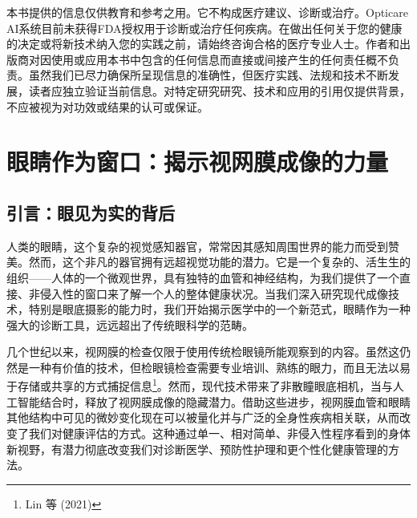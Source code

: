 \documentclass[
  Letterpaper,
]{scrbook}
\begin{document}
\begin{tcolorbox}[enhanced jigsaw, arc=.35mm, breakable, colbacktitle=quarto-callout-caution-color!10!white, colback=white, toprule=.15mm, opacityback=0, left=2mm, titlerule=0mm, colframe=quarto-callout-caution-color-frame, bottomrule=.15mm, toptitle=1mm, bottomtitle=1mm, rightrule=.15mm, leftrule=.75mm, coltitle=black, title=\textcolor{quarto-callout-caution-color}{\faFire}\hspace{0.5em}{免责声明}, opacitybacktitle=0.6]

本书提供的信息仅供教育和参考之用。它不构成医疗建议、诊断或治疗。Opticare
AI系统目前未获得FDA授权用于诊断或治疗任何疾病。在做出任何关于您的健康的决定或将新技术纳入您的实践之前，请始终咨询合格的医疗专业人士。作者和出版商对因使用或应用本书中包含的任何信息而直接或间接产生的任何责任概不负责。虽然我们已尽力确保所呈现信息的准确性，但医疗实践、法规和技术不断发展，读者应独立验证当前信息。对特定研究研究、技术和应用的引用仅提供背景，不应被视为对功效或结果的认可或保证。

\end{tcolorbox}


\chapter{眼睛作为窗口：揭示视网膜成像的力量}\label{ux773cux775bux4f5cux4e3aux7a97ux53e3ux63edux793aux89c6ux7f51ux819cux6210ux50cfux7684ux529bux91cf}

\section{引言：眼见为实的背后}\label{ux5f15ux8a00ux773cux89c1ux4e3aux5b9eux7684ux80ccux540e}

人类的眼睛，这个复杂的视觉感知器官，常常因其感知周围世界的能力而受到赞美。然而，这个非凡的器官拥有远超视觉功能的潜力。它是一个复杂的、活生生的组织------人体的一个微观世界，具有独特的血管和神经结构，为我们提供了一个直接、非侵入性的窗口来了解一个人的整体健康状况。当我们深入研究现代成像技术，特别是眼底摄影的能力时，我们开始揭示医学中的一个新范式，眼睛作为一种强大的诊断工具，远远超出了传统眼科学的范畴。

几个世纪以来，视网膜的检查仅限于使用传统检眼镜所能观察到的内容。虽然这仍然是一种有价值的技术，但检眼镜检查需要专业培训、熟练的眼力，而且无法以易于存储或共享的方式捕捉信息\footnote{Lin
  等 (2021)}。然而，现代技术带来了非散瞳眼底相机，当与人工智能结合时，释放了视网膜成像的隐藏潜力。借助这些进步，视网膜血管和眼睛其他结构中可见的微妙变化现在可以被量化并与广泛的全身性疾病相关联，从而改变了我们对健康评估的方式。这种通过单一、相对简单、非侵入性程序看到的身体新视野，有潜力彻底改变我们对诊断医学、预防性护理和更个性化健康管理的方法。
\end{document}
